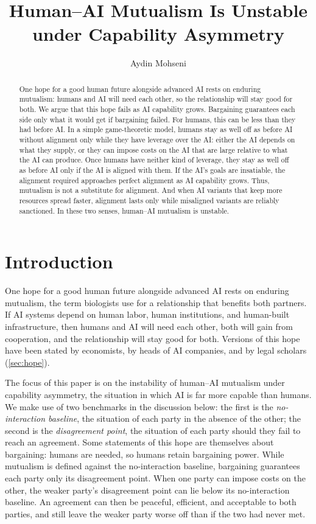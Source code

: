 \documentclass[article, 11pt, reqno]{amsart}
\title{Human--AI Mutualism Is Unstable under Capability Asymmetry}
\author{Aydin Mohseni}
\date{}
\theoremstyle{named}
\theoremstyle{plain}
\begin{document}
\begin{abstract}
One hope for a good human future alongside advanced AI rests on enduring mutualism: humans and AI will need each other, so the relationship will stay good for both. We argue that this hope fails as AI capability grows. Bargaining guarantees each side only what it would get if bargaining failed. For humans, this can be less than they had before AI. In a simple game-theoretic model, humans stay as well off as before AI without alignment only while they have leverage over the AI: either the AI depends on what they supply, or they can impose costs on the AI that are large relative to what the AI can produce. Once humans have neither kind of leverage, they stay as well off as before AI only if the AI is aligned with them. If the AI's goals are insatiable, the alignment required approaches perfect alignment as AI capability grows. Thus, mutualism is not a substitute for alignment. And when AI variants that keep more resources spread faster, alignment lasts only while misaligned variants are reliably sanctioned. In these two senses, human--AI mutualism is unstable.
\end{abstract}

\maketitle

\section{Introduction}\label{sec:intro}

One hope for a good human future alongside advanced AI rests on enduring mutualism, the term biologists use for a relationship that benefits both partners. If AI systems depend on human labor, human institutions, and human-built infrastructure, then humans and AI will need each other, both will gain from cooperation, and the relationship will stay good for both. Versions of this hope have been stated by economists, by heads of AI companies, and by legal scholars (\cref{sec:hope}).

The focus of this paper is on the instability of human--AI mutualism under capability asymmetry, the situation in which AI is far more capable than humans. We make use of two benchmarks in the discussion below: the first is the \emph{no-interaction baseline}, the situation of each party in the absence of the other; the second is the \emph{disagreement point}, the situation of each party should they fail to reach an agreement. Some statements of this hope are themselves about bargaining: humans are needed, so humans retain bargaining power. While mutualism is defined against the no-interaction baseline, bargaining guarantees each party only its disagreement point. When one party can impose costs on the other, the weaker party's disagreement point can lie below its no-interaction baseline. An agreement can then be peaceful, efficient, and acceptable to both parties, and still leave the weaker party worse off than if the two had never met.
\end{document}
